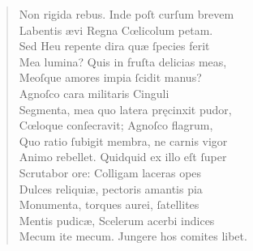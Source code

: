 \documentclass[a4paper,12pt]{article}
\begin{document}
\begin{verse}
Non rigida rebus. Inde poſt curſum brevem\\[0pt]
Labentis ævi Regna Cœlicolum petam.\\[0pt]
Sed Heu repente dira quæ ſpecies ferit\\[0pt]
Mea lumina? Quis in fruſta delicias meas,\\[0pt]
Meoſque amores impia ſcidit manus?\\[0pt]
Agnoſco cara militaris Cinguli\\[0pt]
Segmenta, mea quo latera pręcinxit pudor,\\[0pt]
Cœloque conſecravit; Agnoſco flagrum,\\[0pt]
Quo ratio ſubigit membra, ne carnis vigor\\[0pt]
Animo rebellet. Quidquid ex illo eſt ſuper\\[0pt]
Scrutabor ore: Colligam laceras opes\\[0pt]
Dulces reliquiæ, pectoris amantis pia\\[0pt]
Monumenta, torques aurei, ſatellites\\[0pt]
Mentis pudicæ, Scelerum acerbi indices\\[0pt]
Mecum ite mecum. Jungere hos comites libet.\\[0pt]
\end{verse}
\end{document}
